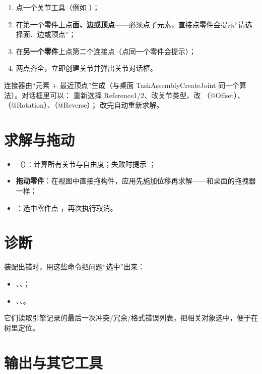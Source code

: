 \begin{enumerate}
  \item 点一个关节工具（例如 ）；
  \item 在第一个零件上点\textbf{面、边或顶点}——必须点子元素，直接点零件会提示“请选择面、边或顶点”；
  \item 在\textbf{另一个零件}上点第二个连接点（点同一个零件会提示）；
  \item 两点齐全，立即创建关节并弹出关节对话框。
\end{enumerate}

连接器由“元素 + 最近顶点”生成（与桌面 TaskAssemblyCreateJoint 同一个算法）。对话框里可以：
重新选择 Reference1/2、改关节类型、改 （@Offset）、（@Rotation）、（@Reverse）；
改完自动重新求解。

\section{求解与拖动}

\begin{itemize}
  \item {}（）：计算所有关节与自由度；失败时提示
        ；
  \item \textbf{拖动零件}：在视图中直接拖构件，应用先施加位移再求解——和桌面的拖拽器一样；
  \item {}：选中零件点 ，再次执行取消。
\end{itemize}

\section{诊断}

装配出错时，用这些命令把问题“选中”出来：

\begin{itemize}
  \item {}、、；
  \item {}、、。
\end{itemize}

它们读取引擎记录的最后一次冲突/冗余/格式错误列表，把相关对象选中，便于在树里定位。

\section{输出与其它工具}

